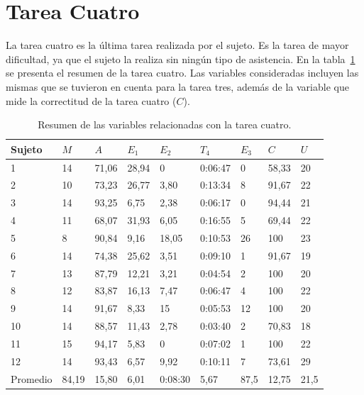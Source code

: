 \section{Tarea Cuatro}

La tarea cuatro es la \'ultima tarea realizada por el sujeto. Es la tarea
de mayor dificultad, ya que el sujeto la realiza sin ning\'un tipo de asistencia. 
En la tabla~\ref{sec:tabla-tarea4} se presenta el resumen de la tarea cuatro.
Las variables consideradas incluyen las mismas que se tuvieron en cuenta para la tarea
tres, adem\'as de la variable que mide la correctitud de la tarea cuatro ($C$).

\begin{table}[H]
\centering
\footnotesize
\begin{tabular}{|p{1.4cm}|p{1.4cm}|p{1.4cm}|p{1.4cm}|p{1.4cm}|p{1.4cm}|p{1.4cm}|p{1.4cm}|p{1.4cm}|}
\hline
Sujeto & $M$ & $A$ & $E_1$ & $E_2$  & $T_4$      & $E_3$ & $C$ & $U$ \\
 \hline 
1  & 14 &  71,06 & 28,94 &  0     &  0:06:47   &  0  &  58,33 &  20  \\ 
2  & 10 &  73,23 & 26,77 &  3,80  &  0:13:34   &  8  &  91,67 &  22 \\
3  & 14 &  93,25 & 6,75  &  2,38  &  0:06:17   &  0  &  94,44 &  21 \\
4  & 11 &  68,07 & 31,93 &  6,05  &  0:16:55   &  5  &  69,44 &  22 \\
5  & 8  &  90,84 & 9,16  &  18,05 &  0:10:53   &  26 &  100   &  23 \\
6  & 14 &  74,38 & 25,62 &  3,51  &  0:09:10   &  1  &  91,67 &  19  \\
7  & 13 &  87,79 & 12,21 &  3,21  &  0:04:54   &  2  &  100   &  20  \\
8  & 12 &  83,87 & 16,13 &  7,47  &  0:06:47   &  4  &  100   &  22  \\
9  & 14 &  91,67 & 8,33  &  15    &  0:05:53   &  12 &  100   &  20  \\
10 & 14 &  88,57 & 11,43 &  2,78  &  0:03:40   &  2  &  70,83 &  18  \\
11 & 15 &  94,17 & 5,83  &  0     &  0:07:02   &  1  &  100   &  22  \\
12 & 14 &  93,43 & 6,57  &  9,92  &  0:10:11   &  7  &  73,61 &  29  \\
\hline
  Promedio & 84,19   & 15,80 & 6,01 & 0:08:30 & 5,67 & 87,5  &  12,75 & 21,5   \\
\hline
\end{tabular}
\caption{Resumen de las variables relacionadas con la tarea cuatro.}
\label{sec:tabla-tarea4}
\end{table}

